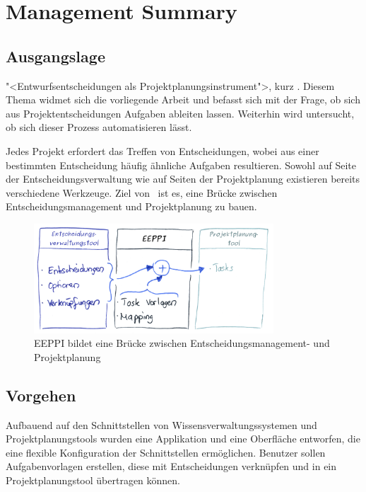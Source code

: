\chapter{Management Summary}
	\captionsetup[figure]{labelformat=empty} %

	
	\section{Ausgangslage}
	
	"<Entwurfsentscheidungen als Projektplanungsinstrument">, kurz \eeppi. 
	Diesem Thema widmet sich die vorliegende Arbeit und befasst sich mit der Frage, 
	ob sich aus Projektentscheidungen Aufgaben ableiten lassen. 
	Weiterhin wird untersucht, ob sich dieser Prozess automatisieren lässt. 

	Jedes Projekt erfordert das Treffen von Entscheidungen, 
	wobei aus einer bestimmten Entscheidung häufig ähnliche Aufgaben resultieren. 
	Sowohl auf Seite der Entscheidungsverwaltung wie auf Seiten der Projektplanung existieren bereits verschiedene Werkzeuge. 
	Ziel von \eeppi\ ist es, eine Brücke zwischen Entscheidungsmanagement und Projektplanung zu bauen.
	
	\begin{figure}[H]
		\includegraphics[width=0.8\textwidth]{introduction/img/eeppiVision.png}
		\centering
		\caption{EEPPI bildet eine Brücke zwischen Entscheidungsmanagement- und Projektplanung}
		\label{fig:eeppiBridgeBetweenDecisionsAndTasks}
	\end{figure}
	
	
	\section{Vorgehen}
	
	Aufbauend auf den Schnittstellen von Wissensverwaltungssystemen und Projektplanungstools wurden eine Applikation und eine Oberfläche entworfen, 
	die eine flexible Konfiguration der Schnittstellen ermöglichen. 
	Benutzer sollen Aufgabenvorlagen erstellen, diese mit Entscheidungen verknüpfen und in ein Projektplanungstool übertragen können. 

